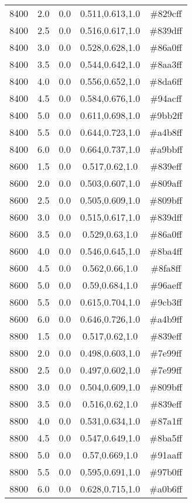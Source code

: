 \begin{tabular}{ccccc}
8400 & 2.0 & 0.0 & 0.511,0.613,1.0 & \#829cff \\ 
8400 & 2.5 & 0.0 & 0.516,0.617,1.0 & \#839dff \\ 
8400 & 3.0 & 0.0 & 0.528,0.628,1.0 & \#86a0ff \\ 
8400 & 3.5 & 0.0 & 0.544,0.642,1.0 & \#8aa3ff \\ 
8400 & 4.0 & 0.0 & 0.556,0.652,1.0 & \#8da6ff \\ 
8400 & 4.5 & 0.0 & 0.584,0.676,1.0 & \#94acff \\ 
8400 & 5.0 & 0.0 & 0.611,0.698,1.0 & \#9bb2ff \\ 
8400 & 5.5 & 0.0 & 0.644,0.723,1.0 & \#a4b8ff \\ 
8400 & 6.0 & 0.0 & 0.664,0.737,1.0 & \#a9bbff \\ 
8600 & 1.5 & 0.0 & 0.517,0.62,1.0 & \#839eff \\ 
8600 & 2.0 & 0.0 & 0.503,0.607,1.0 & \#809aff \\ 
8600 & 2.5 & 0.0 & 0.505,0.609,1.0 & \#809bff \\ 
8600 & 3.0 & 0.0 & 0.515,0.617,1.0 & \#839dff \\ 
8600 & 3.5 & 0.0 & 0.529,0.63,1.0 & \#86a0ff \\ 
8600 & 4.0 & 0.0 & 0.546,0.645,1.0 & \#8ba4ff \\ 
8600 & 4.5 & 0.0 & 0.562,0.66,1.0 & \#8fa8ff \\ 
8600 & 5.0 & 0.0 & 0.59,0.684,1.0 & \#96aeff \\ 
8600 & 5.5 & 0.0 & 0.615,0.704,1.0 & \#9cb3ff \\ 
8600 & 6.0 & 0.0 & 0.646,0.726,1.0 & \#a4b9ff \\ 
8800 & 1.5 & 0.0 & 0.517,0.62,1.0 & \#839eff \\ 
8800 & 2.0 & 0.0 & 0.498,0.603,1.0 & \#7e99ff \\ 
8800 & 2.5 & 0.0 & 0.497,0.602,1.0 & \#7e99ff \\ 
8800 & 3.0 & 0.0 & 0.504,0.609,1.0 & \#809bff \\ 
8800 & 3.5 & 0.0 & 0.516,0.62,1.0 & \#839eff \\ 
8800 & 4.0 & 0.0 & 0.531,0.634,1.0 & \#87a1ff \\ 
8800 & 4.5 & 0.0 & 0.547,0.649,1.0 & \#8ba5ff \\ 
8800 & 5.0 & 0.0 & 0.57,0.669,1.0 & \#91aaff \\ 
8800 & 5.5 & 0.0 & 0.595,0.691,1.0 & \#97b0ff \\ 
8800 & 6.0 & 0.0 & 0.628,0.715,1.0 & \#a0b6ff \\ 

\end{tabular}
